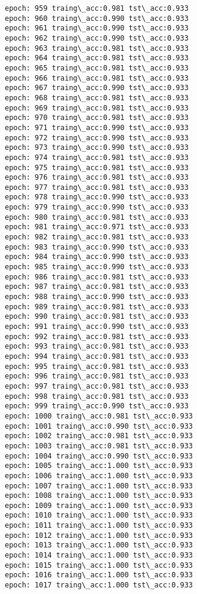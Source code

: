 \documentclass[11pt]{article}
\begin{document}
\begin{Verbatim}[commandchars=\\\{\}]
epoch: 959 traing\_acc:0.981 tst\_acc:0.933
epoch: 960 traing\_acc:0.990 tst\_acc:0.933
epoch: 961 traing\_acc:0.990 tst\_acc:0.933
epoch: 962 traing\_acc:0.990 tst\_acc:0.933
epoch: 963 traing\_acc:0.981 tst\_acc:0.933
epoch: 964 traing\_acc:0.981 tst\_acc:0.933
epoch: 965 traing\_acc:0.981 tst\_acc:0.933
epoch: 966 traing\_acc:0.981 tst\_acc:0.933
epoch: 967 traing\_acc:0.990 tst\_acc:0.933
epoch: 968 traing\_acc:0.981 tst\_acc:0.933
epoch: 969 traing\_acc:0.981 tst\_acc:0.933
epoch: 970 traing\_acc:0.981 tst\_acc:0.933
epoch: 971 traing\_acc:0.990 tst\_acc:0.933
epoch: 972 traing\_acc:0.990 tst\_acc:0.933
epoch: 973 traing\_acc:0.990 tst\_acc:0.933
epoch: 974 traing\_acc:0.981 tst\_acc:0.933
epoch: 975 traing\_acc:0.981 tst\_acc:0.933
epoch: 976 traing\_acc:0.981 tst\_acc:0.933
epoch: 977 traing\_acc:0.981 tst\_acc:0.933
epoch: 978 traing\_acc:0.990 tst\_acc:0.933
epoch: 979 traing\_acc:0.990 tst\_acc:0.933
epoch: 980 traing\_acc:0.981 tst\_acc:0.933
epoch: 981 traing\_acc:0.971 tst\_acc:0.933
epoch: 982 traing\_acc:0.981 tst\_acc:0.933
epoch: 983 traing\_acc:0.990 tst\_acc:0.933
epoch: 984 traing\_acc:0.990 tst\_acc:0.933
epoch: 985 traing\_acc:0.990 tst\_acc:0.933
epoch: 986 traing\_acc:0.981 tst\_acc:0.933
epoch: 987 traing\_acc:0.981 tst\_acc:0.933
epoch: 988 traing\_acc:0.990 tst\_acc:0.933
epoch: 989 traing\_acc:0.981 tst\_acc:0.933
epoch: 990 traing\_acc:0.981 tst\_acc:0.933
epoch: 991 traing\_acc:0.990 tst\_acc:0.933
epoch: 992 traing\_acc:0.981 tst\_acc:0.933
epoch: 993 traing\_acc:0.981 tst\_acc:0.933
epoch: 994 traing\_acc:0.981 tst\_acc:0.933
epoch: 995 traing\_acc:0.981 tst\_acc:0.933
epoch: 996 traing\_acc:0.981 tst\_acc:0.933
epoch: 997 traing\_acc:0.981 tst\_acc:0.933
epoch: 998 traing\_acc:0.981 tst\_acc:0.933
epoch: 999 traing\_acc:0.990 tst\_acc:0.933
epoch: 1000 traing\_acc:0.981 tst\_acc:0.933
epoch: 1001 traing\_acc:0.990 tst\_acc:0.933
epoch: 1002 traing\_acc:0.981 tst\_acc:0.933
epoch: 1003 traing\_acc:0.981 tst\_acc:0.933
epoch: 1004 traing\_acc:0.990 tst\_acc:0.933
epoch: 1005 traing\_acc:1.000 tst\_acc:0.933
epoch: 1006 traing\_acc:1.000 tst\_acc:0.933
epoch: 1007 traing\_acc:1.000 tst\_acc:0.933
epoch: 1008 traing\_acc:1.000 tst\_acc:0.933
epoch: 1009 traing\_acc:1.000 tst\_acc:0.933
epoch: 1010 traing\_acc:1.000 tst\_acc:0.933
epoch: 1011 traing\_acc:1.000 tst\_acc:0.933
epoch: 1012 traing\_acc:1.000 tst\_acc:0.933
epoch: 1013 traing\_acc:1.000 tst\_acc:0.933
epoch: 1014 traing\_acc:1.000 tst\_acc:0.933
epoch: 1015 traing\_acc:1.000 tst\_acc:0.933
epoch: 1016 traing\_acc:1.000 tst\_acc:0.933
epoch: 1017 traing\_acc:1.000 tst\_acc:0.933

\end{Verbatim}
\end{document}
